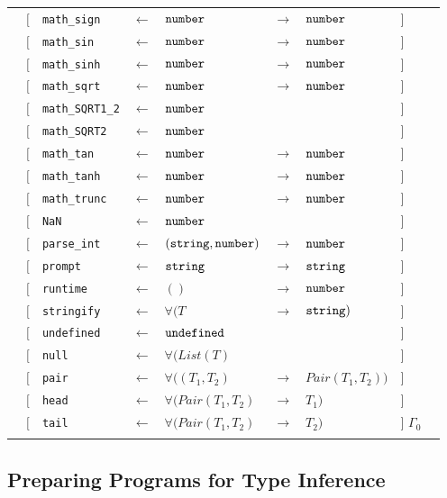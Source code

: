 \begin{tabular}[fragile]{lllllllll}
& $[$ & \texttt{math\_sign} & $\leftarrow$  & $\texttt{number}$ & $\rightarrow$ & $\texttt{number}$ & $]$ \\
& $[$ & \texttt{math\_sin} & $\leftarrow$  & $\texttt{number}$ & $\rightarrow$ & $\texttt{number}$ & $]$ \\
& $[$ & \texttt{math\_sinh} & $\leftarrow$  & $\texttt{number}$ & $\rightarrow$ & $\texttt{number}$ & $]$ \\
& $[$ & \texttt{math\_sqrt} & $\leftarrow$  & $\texttt{number}$ & $\rightarrow$ & $\texttt{number}$ & $]$ \\
& $[$ & \texttt{math\_SQRT1\_2} & $\leftarrow$  & $\texttt{number}$ & & & $]$ \\
& $[$ & \texttt{math\_SQRT2} & $\leftarrow$  & $\texttt{number}$ & & & $]$ \\
& $[$ & \texttt{math\_tan} & $\leftarrow$  & $\texttt{number}$ & $\rightarrow$ & $\texttt{number}$ & $]$ \\
& $[$ & \texttt{math\_tanh} & $\leftarrow$  & $\texttt{number}$ & $\rightarrow$ & $\texttt{number}$ & $]$ \\
& $[$ & \texttt{math\_trunc} & $\leftarrow$  & $\texttt{number}$ & $\rightarrow$ & $\texttt{number}$ & $]$ \\
& $[$ & \texttt{NaN} & $\leftarrow$  & $\texttt{number}$ & & & $]$ \\
& $[$ & \texttt{parse\_int} & $\leftarrow$  & $(\texttt{string}, \texttt{number})$ & $\rightarrow$ & $\texttt{number}$ & $]$ \\
& $[$ & \texttt{prompt} & $\leftarrow$  & $\texttt{string}$ & $\rightarrow$ & $\texttt{string}$ & $]$ \\
& $[$ & \texttt{runtime} & $\leftarrow$  & $()$ & $\rightarrow$ & $\texttt{number}$ & $]$ \\
& $[$ & \texttt{stringify} & $\leftarrow$  & $\forall(T$ & $\rightarrow$ & $\texttt{string})$ & $]$ \\
& $[$ & \texttt{undefined} & $\leftarrow$  & $\texttt{undefined}$ & & & $]$ & \\
& $[$ & \texttt{null}      & $\leftarrow$  & $\forall(List(T)$ & & & $]$ \\
& $[$ & \texttt{pair} & $\leftarrow$  & $\forall((T_1,T_2)$ & $\rightarrow$ & $Pair(T_1,T_2))$ & $]$ \\
& $[$ & \texttt{head} & $\leftarrow$  & $\forall(Pair(T_1,T_2)$ & $\rightarrow$ & $T_1)$ & $]$ \\
& $[$ & \texttt{tail} & $\leftarrow$  & $\forall(Pair(T_1,T_2)$ & $\rightarrow$ & $T_2)$ & $]$ $\Gamma_0$ \\
& \end{tabular}
 
\subsection{Preparing Programs for Type Inference}

